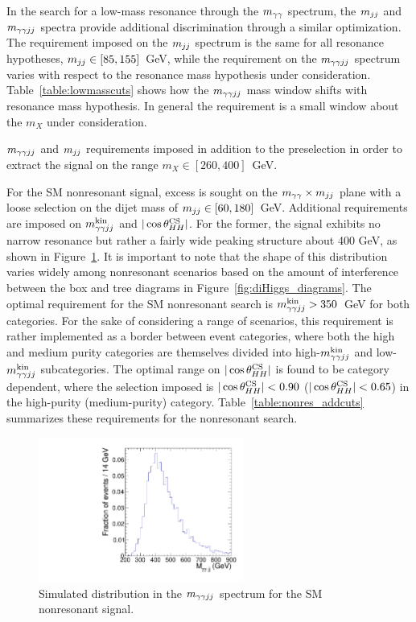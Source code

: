 In the search for a low-mass resonance through the $m_{\gamma\gamma}$ spectrum, the $m_{jj}$ and $m_{\gamma\gamma jj}$ spectra
provide additional discrimination through a similar optimization. The requirement imposed
on the $m_{jj}$ spectrum is the same for all resonance hypotheses, $m_{jj} \in [85,155]$~GeV, while the
requirement on the $m_{\gamma\gamma jj}$ spectrum varies with respect to the resonance mass hypothesis
under consideration.
Table~\ref{table:lowmasscuts} shows how the $m_{\gamma\gamma jj}$ mass window shifts with resonance mass hypothesis.
In general the requirement is a small window about the $m_X$ under consideration.

\begin{table}[htbp!]
  \centering
  \renewcommand{\arraystretch}{1.4}
  \caption{$m_{\gamma\gamma jj}$ and $m_{jj}$ requirements imposed in addition to the preselection in order to extract
the signal on the range $m_X \in [260, 400]$~GeV.}
  
  \label{table:lowmasscuts}
\end{table}

For the SM nonresonant signal, excess is sought on the $m_{\gamma\gamma} \times m_{jj}$ plane with a
loose selection on the dijet mass of $m_{jj} \in [60, 180]$~GeV.
Additional requirements are imposed on $m_{\gamma\gamma jj}^{\rm kin}$ and $|\cos {\theta^{\rm CS}_{HH}}|$. For the former, the signal
exhibits no narrow resonance but rather a fairly wide peaking structure about 400 GeV, as shown in
Figure~\ref{fig:ggHH_4body}. It is important
to note that the shape of this distribution varies widely among nonresonant scenarios based on
the amount of interference between the box and tree diagrams in Figure~\ref{fig:diHiggs_diagrams}.
The optimal requirement for the SM nonresonant search is $m_{\gamma\gamma jj}^{\rm kin} > 350$~GeV for both categories.
For the sake of considering a range of scenarios, this requirement is rather implemented as a border
between event categories, where both the high and medium purity categories are themselves divided into
high-$m_{\gamma\gamma jj}^{\rm kin}$ and low-$m_{\gamma\gamma jj}^{\rm kin}$ subcategories.
The optimal range on $|\cos {\theta^{\rm CS}_{HH}}|$ is found to be category dependent, where the selection imposed
is $|\cos {\theta^{\rm CS}_{HH}}| < 0.90$ ($|\cos {\theta^{\rm CS}_{HH}}| < 0.65$) in the high-purity (medium-purity) category.
Table~\ref{table:nonres_addcuts} summarizes these requirements for the nonresonant search.

\begin{figure}[htbp!]
 \begin{center}
   \includegraphics[width=0.6\textwidth]{figures/selection/ggHH_4body.pdf}
 \end{center}
\caption{Simulated distribution in the $m_{\gamma\gamma jj}$ spectrum for the SM nonresonant signal.}
\label{fig:ggHH_4body}
\end{figure}



